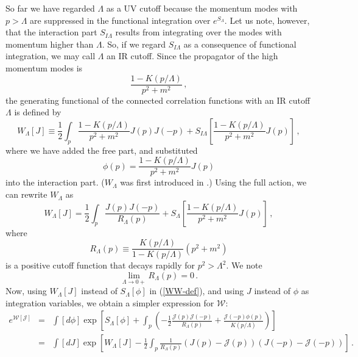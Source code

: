 \documentclass[aps,prd,preprint,groupedaddress,preprintnumbers,longbibliography]{revtex4-1}
\newcommand{\nn}{\nonumber}
\newcommand{\SL}{S_\Lambda}
\newcommand{\SIL}{S_{I\Lambda}}
\newcommand{\WW}{\mathcal{W}}
\newcommand{\JJ}{\mathcal{J}}
\begin{document}
So far we have regarded $\Lambda$ as a UV cutoff because the momentum
modes with $p > \Lambda$ are suppressed in the functional integration
over $e^{\SL}$.  Let us note, however, that the interaction part
$\SIL$ results from integrating over the modes with momentum higher
than $\Lambda$.  So, if we regard $\SIL$ as a consequence of
functional integration, we may call $\Lambda$ an IR cutoff.  Since the
propagator of the high momentum modes is
\begin{equation}
\frac{1 - K(p/\Lambda)}{p^2 + m^2}\,,
\end{equation}
the generating functional of the connected correlation functions with
an IR cutoff $\Lambda$ is defined by
\begin{equation}
W_\Lambda [J] \equiv \frac{1}{2} \int_p \frac{1-K(p/\Lambda)}{p^2+m^2}
J(p) J(-p) + \SIL \left[ \frac{1-K(p/\Lambda)}{p^2+m^2}
  J(p)\right]\,, \label{WL-def}
\end{equation}
where we have added the free part, and substituted
\begin{equation}
\phi (p) = \frac{1-K(p/\Lambda)}{p^2+m^2} J(p)
\end{equation}
into the interaction part.  ($W_\Lambda$ was first introduced in
\cite{Morris:1994ie}.)  Using the full action, we can rewrite
$W_\Lambda$ as
\begin{equation}
W_\Lambda [J] = \frac{1}{2} \int_p \frac{J (p) J(-p)}{R_\Lambda (p)}
 + \SL \left[ \frac{1-K(p/\Lambda)}{p^2+m^2}
  J(p)\right] \,, \label{WL-SL}
\end{equation}
where
\begin{equation}
R_\Lambda (p) \equiv \frac{K(p/\Lambda)}{1-K(p/\Lambda)} (p^2+m^2)
\label{RL-K}
\end{equation}
is a positive cutoff function that decays rapidly for $p^2 >
\Lambda^2$.  We note
\begin{equation}
\lim_{\Lambda \to 0+} R_\Lambda (p) = 0\,.\label{vanishing-RL}
\end{equation}
Now, using $W_\Lambda [J]$ instead of $\SL [\phi]$ in (\ref{WW-def}),
and using $J$ instead of $\phi$ as integration variables, we obtain a
simpler expression for $\WW$:
\begin{eqnarray}
e^{\WW [\JJ]} &=& \int [d\phi] \exp \left[ \SL [\phi] + \int_p \left(
    - \frac{1}{2} \frac{\JJ (p) \JJ (-p)}{R_\Lambda (p)} + \frac{\JJ
      (-p) \phi (p)}{K(p/\Lambda)} \right)\right]\nn\\
&=& \int [dJ] \exp \left[ W_\Lambda [J] - \frac{1}{2} \int_p
  \frac{1}{R_\Lambda (p)} \left( J(p) - \JJ (p) \right)\left( J (-p) -
    \JJ (-p) \right)\right]\,.\label{WW-W}
\end{eqnarray}
\end{document}
